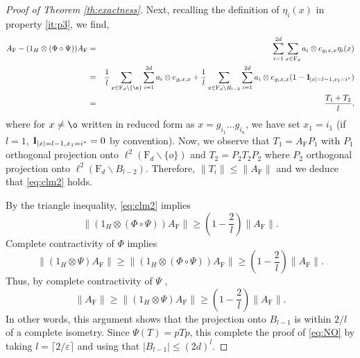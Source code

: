 \documentclass[11pt]{article}
\renewcommand{\star}{{\mathrm{F}}}
\newcommand{\dF}{\mathrm{F}}
\newcommand{\1}{1\!\!{\sf I}}
\newcommand{\IND}{\1}
\newcommand{\veps}{\varepsilon}
\begin{document}
\begin{proof}[Proof of Theorem \ref{th:exactness}]
Next, recalling the definition of $\eta_i(x)$ in property \eqref{it:p3}, we find, 
\begin{eqnarray*}
 A_\star -   (1_H \otimes (\Phi  \circ \Psi)) A_\star   &  =&   \sum_{i=1}^{2d} \sum_{x \in \dF_d} a_i \otimes e_{g_i x ,x} \eta_i(x) \\
  & =& \frac 1 l \sum_{x \in \dF_d \backslash \{\o\} } \sum_{i=1}^{2d}  a_i \otimes e_{g_i x ,x} + \frac 1 l \sum_{x \in \dF_d \backslash B_{l-2}} \sum_{i=1}^{2d}  a_i \otimes e_{g_i x ,x} ( 1 -\IND_{|x| = l-1, x_1 = i^{*}}) \\
  & = & \frac{T_1 + T_2}{ l } ,
\end{eqnarray*}
where for $x \ne \o$ written in reduced form as $x =g_{i_1}\ldots g_{i_n}$, we have set $x_1 = i_1$ (if $l=1$, $\IND_{|x| = l-1, x_1 = i^{*}} = 0$ by convention). Now, we observe that $T_1 = A_\star P_1$ with $P_1$ orthogonal projection onto $\ell^2( \dF_d \backslash \{o\})$ and $T_2 = P_2 T_2 P_2$ where $P_2$ orthogonal projection onto $\ell^2( \dF_d \backslash B_{l-2})$. Therefore, $\| T_i \| \leq \| A_\star \|$ and we deduce that \eqref{eq:clm2} holds.

By the triangle inequality, \eqref{eq:clm2} implies
$$\|( 1_H\otimes (\Phi\circ \Psi ) ) A_\star\|\ge  (1-\frac{2}{l}) \|A_\star\|.$$
Complete contractivity of $\Phi$ implies
$$\|(1_H\otimes \Psi ) A_\star\|\ge \|(1_H\otimes (\Phi\circ \Psi ))A_\star \| \geq (1-\frac{2}{l}) \|A_\star\|.$$
Thus, by complete contractivity of $\Psi$ ,
\begin{equation}\label{eq:NO2}
\|A_\star \|\ge \| (1_H\otimes \Psi ) A_\star \|\ge (1- \frac{2}{l} ) \|A_\star\|.
\end{equation}
In other words, this argument shows that the projection onto $B_{l-1}$ is within $2/l$ of a complete isometry. Since  $\Psi (T) = p T p$, this complete the proof of \eqref{eq:NO} by taking $l = \lceil 2 / \veps \rceil$ and using that $ | B_{l-1}| \leq (2d)^l$.


\end{proof}
\end{document}

